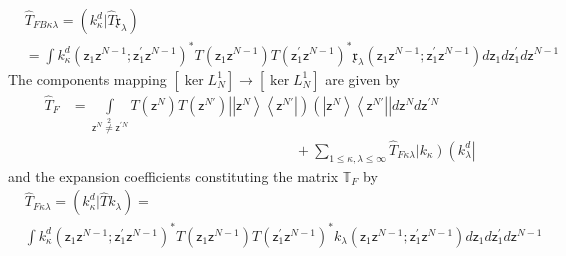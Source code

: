 \documentclass[aps,preprint]{revtex4}%
\begin{document}
\begin{align}
&  \hat{T}_{FB\kappa\lambda}=\left(  k_{\kappa}^{d}|\hat{T}\mathfrak{x}%
_{\lambda}\right)  \qquad\qquad\qquad\qquad\qquad\qquad\qquad\qquad
\qquad\qquad\qquad\qquad\qquad\nonumber\\
&  =%
{\displaystyle\int}
k_{\kappa}^{d}\left(  \mathsf{z}_{1}\mathsf{z}^{N-1};\mathsf{z}_{1}^{\prime
}\mathsf{z}^{N-1}\right)  ^{\ast}T\left(  \mathsf{z}_{1}\mathsf{z}%
^{N-1}\right)  T\left(  \mathsf{z}_{1}^{\prime}\mathsf{z}^{N-1}\right)
^{\ast}\mathfrak{x}_{\lambda}\left(  \mathsf{z}_{1}\mathsf{z}^{N-1}%
;\mathsf{z}_{1}^{\prime}\mathsf{z}^{N-1}\right)  d\mathsf{z}_{1}%
d\mathsf{z}_{1}^{\prime}d\mathsf{z}^{N-1}%
\end{align}
The components mapping $\left[  \ker L_{N}^{1}\right]  \rightarrow\left[  \ker
L_{N}^{1}\right]  $ are given by
\begin{align}
\hat{T}_{F}  &  =%
{\displaystyle\int\limits_{\mathsf{z}^{N}\overset{2}{\neq}\mathsf{z}^{\prime
N}}}
T\left(  \mathsf{z}^{N}\right)  T\left(  \mathsf{z}^{N\prime}\right)
\left\vert \left\vert \mathsf{z}^{N}\right\rangle \left\langle \mathsf{z}%
^{N\prime}\right\vert \right)  \left(  \left\vert \mathsf{z}^{N}\right\rangle
\left\langle \mathsf{z}^{N\prime}\right\vert \right\vert d\mathsf{z}%
^{N}d\mathsf{z}^{\prime N}\nonumber\\
&  \qquad\qquad\qquad\qquad\qquad\qquad\qquad\qquad+%
{\displaystyle\sum\limits_{1\leq\kappa,\lambda\leq\infty}}
\hat{T}_{F\kappa\lambda}\left\vert k_{\kappa}\right)  \left(  k_{\lambda}%
^{d}\right\vert
\end{align}
and the expansion coefficients constituting the matrix $\mathbb{T}_{F}$ by%
\begin{align}
&  \hat{T}_{F\kappa\lambda}=\left(  k_{\kappa}^{d}|\hat{T}k_{\lambda}\right)
=\qquad\qquad\qquad\qquad\qquad\qquad\qquad\qquad\qquad\qquad\qquad
\qquad\qquad\nonumber\\
&
{\displaystyle\int}
k_{\kappa}^{d}\left(  \mathsf{z}_{1}\mathsf{z}^{N-1};\mathsf{z}_{1}^{\prime
}\mathsf{z}^{N-1}\right)  ^{\ast}T\left(  \mathsf{z}_{1}\mathsf{z}%
^{N-1}\right)  T\left(  \mathsf{z}_{1}^{\prime}\mathsf{z}^{N-1}\right)
^{\ast}k_{\lambda}\left(  \mathsf{z}_{1}\mathsf{z}^{N-1};\mathsf{z}%
_{1}^{\prime}\mathsf{z}^{N-1}\right)  d\mathsf{z}_{1}d\mathsf{z}_{1}^{\prime
}d\mathsf{z}^{N-1}%
\end{align}
\end{document}

